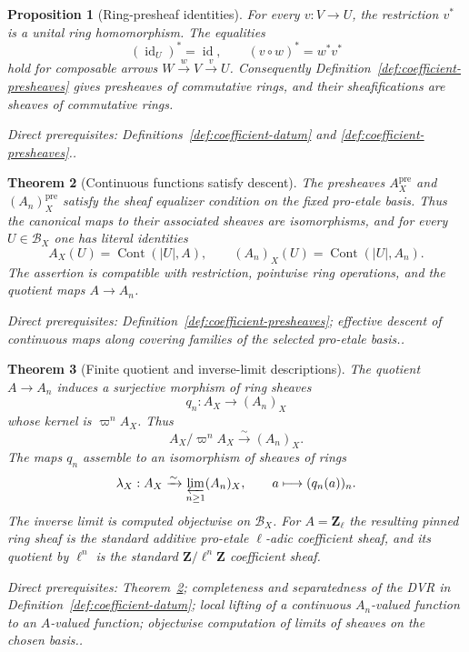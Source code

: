 \documentclass[10pt]{article}
\newtheorem{theorem}{Theorem}[section]
\newtheorem{proposition}[theorem]{Proposition}
\theoremstyle{definition}
\newcommand{\Zl}{\mathbf Z_\ell}
\newcommand{\depends}[1]{\par\smallskip\noindent\textit{Direct prerequisites:} #1.}
\begin{document}
\begin{proposition}[Ring-presheaf identities]\label{prop:ring-presheaf}
For every $v:V\to U$, the restriction $v^*$ is a unital ring homomorphism.
The equalities
\[
 (\operatorname{id}_U)^*=\operatorname{id},\qquad
 (v\circ w)^*=w^*v^*
\]
hold for composable arrows $W\xrightarrow{w}V\xrightarrow{v}U$.
Consequently Definition~\ref{def:coefficient-presheaves} gives presheaves
of commutative rings, and their sheafifications are sheaves of commutative
rings.
\depends{Definitions~\ref{def:coefficient-datum} and
\ref{def:coefficient-presheaves}.}
\end{proposition}

\begin{theorem}[Continuous functions satisfy descent]
\label{thm:continuous-functions-sheaf}
The presheaves $A_X^{\mathrm{pre}}$ and $(A_n)_X^{\mathrm{pre}}$ satisfy the
sheaf equalizer condition on the fixed pro-etale basis.  Thus the canonical
maps to their associated sheaves are isomorphisms, and for every
$U\in\mathcal B_X$ one has literal identities
\[
 A_X(U)=\operatorname{Cont}(|U|,A),\qquad
 (A_n)_X(U)=\operatorname{Cont}(|U|,A_n).
\]
The assertion is compatible with restriction, pointwise ring operations,
and the quotient maps $A\to A_n$.
\depends{Definition~\ref{def:coefficient-presheaves}; effective descent of
continuous maps along covering families of the selected pro-etale basis.}
\end{theorem}

\begin{theorem}[Finite quotient and inverse-limit descriptions]
\label{thm:coefficient-comparison}
The quotient $A\to A_n$ induces a surjective morphism of ring sheaves
\[
 q_n:A_X\longrightarrow(A_n)_X
\]
whose kernel is $\varpi^nA_X$.  Thus
\[
 A_X/\varpi^nA_X\xrightarrow{\sim}(A_n)_X.
\]
The maps $q_n$ assemble to an isomorphism of sheaves of rings
\[
 \lambda_X:A_X\xrightarrow{\sim}
       \varprojlim_{n\geq1}(A_n)_X,
 \qquad a\longmapsto(q_n(a))_n.
\]
The inverse limit is computed objectwise on $\mathcal B_X$.  For $A=\Zl$
the resulting pinned ring sheaf is the standard additive pro-etale
$\ell$-adic coefficient sheaf, and its quotient by $\ell^n$ is the standard
$\mathbf Z/\ell^n\mathbf Z$ coefficient sheaf.
\depends{Theorem~\ref{thm:continuous-functions-sheaf}; completeness and
separatedness of the DVR in Definition~\ref{def:coefficient-datum}; local
lifting of a continuous $A_n$-valued function to an $A$-valued function;
objectwise computation of limits of sheaves on the chosen basis.}
\end{theorem}
\end{document}
